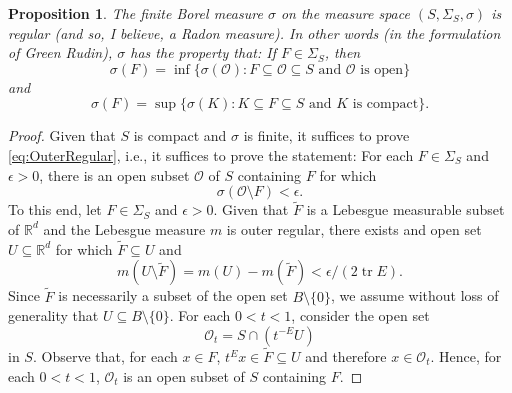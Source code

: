 \documentclass[11pt]{article}
\theoremstyle{theorem}
\newtheorem{proposition}[theorem]{Proposition}
\newcommand\tr{\operatorname{tr}}
\begin{document}
\begin{proposition}\label{prop:Regular}
The finite Borel measure $\sigma$ on the measure space $(S,\Sigma_S,\sigma)$ is regular (and so, I believe, a Radon measure). In other words (in the formulation of Green Rudin), $\sigma$ has the property that: If $F\in \Sigma_S$, then
\begin{equation}\label{eq:OuterRegular}
\sigma(F)=\inf\{\sigma(\mathcal{O}):F\subseteq\mathcal{O}\subseteq S\mbox{ and $\mathcal{O}$ is open}\}
\end{equation}
and
\begin{equation}
\sigma(F)=\sup\{\sigma(K):K\subseteq F\subseteq S\mbox{ and $K$ is compact}\}.
\end{equation}

\end{proposition}
\begin{proof}
Given that $S$ is compact and $\sigma$ is finite, it suffices to prove \eqref{eq:OuterRegular}, i.e., it suffices to prove the statement: For each $F\in \Sigma_S$ and $\epsilon>0$, there is an open subset $\mathcal{O}$ of $S$ containing $F$ for which 
\begin{equation*}
\sigma(\mathcal{O}\setminus F)<\epsilon.
\end{equation*}
To this end, let $F\in \Sigma_S$ and $\epsilon>0$. Given that $\widetilde{F}$ is a Lebesgue measurable subset of $\mathbb{R}^d$ and the Lebesgue measure $m$ is outer regular, there exists and open set $U\subseteq \mathbb{R}^d$ for which $\widetilde{F}\subseteq U$ and
\begin{equation}\label{eq:LebesgueOuter}
m(U\setminus \widetilde{F})=m(U)-m(\widetilde{F})<\epsilon/(2\tr E).
\end{equation}
Since $\widetilde{F}$ is necessarily a subset of the open set $B\setminus\{0\}$, we assume without loss of generality that $U\subseteq B\setminus\{0\}$.
For each $0<t<1$, consider the open set
\begin{equation*}
\mathcal{O}_t=S\cap\left( t^{-E}U\right)
\end{equation*}
in $S$. Observe that, for each $x\in F$, $t^E x\in \widetilde{F}\subseteq U$ and therefore $x\in \mathcal{O}_t$. Hence, for each $0<t<1$, $\mathcal{O}_t$ is an open subset of $S$ containing $F$. 


\end{proof}
\end{document}
